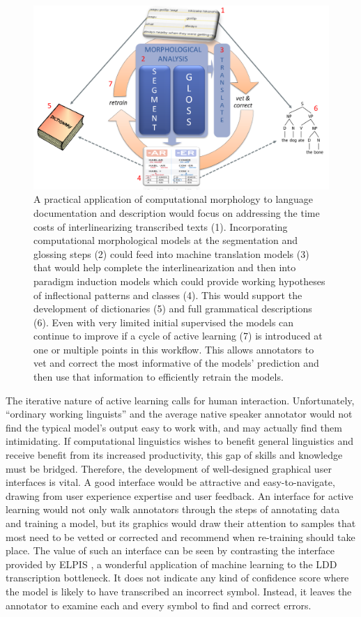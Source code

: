 \documentclass[12pt]{article}
\begin{document}
\begin{figure}[ht]
\label{fig:ML-LDD}
\begin{center}
\includegraphics[width=0.75\columnwidth]{ML-LDD.PNG}
\caption{A practical application of computational morphology to language documentation and description would focus on addressing the time costs of interlinearizing transcribed texts (1). Incorporating computational morphological models at the segmentation and glossing steps (2) could feed into machine translation models (3) that would help complete the interlinearization and then into paradigm induction models which could provide working hypotheses of inflectional patterns and classes (4). This would support the development of dictionaries (5) and full grammatical descriptions (6). Even with very limited initial supervised the models can continue to improve if a cycle of active learning (7) is introduced at one or multiple points in this workflow. This allows annotators to vet and correct the most informative of the models' prediction and then use that information to efficiently retrain the models.}
\end{center}
\end{figure}

The iterative nature of active learning calls for human interaction. Unfortunately, ``ordinary working linguists'' and the average native speaker annotator would not find the typical model's output easy to work with, and may actually find them intimidating. If computational linguistics wishes to benefit general linguistics and receive benefit from its increased productivity, this gap of skills and knowledge must be bridged. Therefore, the development of well-designed graphical user interfaces is vital. A good interface would be attractive and easy-to-navigate, drawing from user experience expertise and user feedback. An interface for active learning would not only walk annotators through the steps of annotating data and training a model, but its graphics would draw their attention to samples that most need to be vetted or corrected and recommend when re-training should take place. The value of such an interface can be seen by contrasting the interface provided by ELPIS \cite{foley_elpis_2018}, a wonderful application of machine learning to the LDD transcription bottleneck. It does not indicate any kind of confidence score where the model is likely to have transcribed an incorrect symbol. Instead, it leaves the annotator to examine each and every symbol to find and correct errors. 
\end{document}
